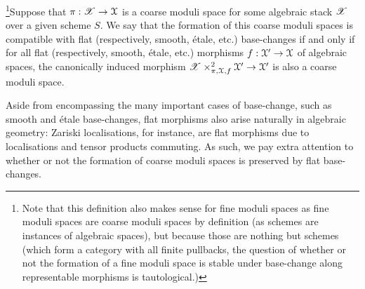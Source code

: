            \begin{definition} \label{def: stability_of_coarse_moduli_spaces}
                \footnote{Note that this definition also makes sense for fine moduli spaces as fine moduli spaces are coarse moduli spaces by definition (as schemes are instances of algebraic spaces), but because those are nothing but schemes (which form a category with all finite pullbacks, the question of whether or not the formation of a fine moduli space is stable under base-change along representable morphisms is tautological.)}Suppose that $\pi: \mathscr{X} \to \mathcal{X}$ is a coarse moduli space for some algebraic stack $\mathscr{X}$ over a given scheme $S$. We say that the formation of this coarse moduli spaces is compatible with flat (respectively, smooth, \'etale, etc.) base-changes if and only if for all flat (respectively, smooth, \'etale, etc.) morphisms $f: \mathcal{X}' \to \mathcal{X}$ of algebraic spaces, the canonically induced morphism $\scrX \x^2_{\pi, \calX, f} \calX' \to \calX'$ is also a coarse moduli space.   
            \end{definition}
            \begin{remark} \label{remark: flat_base_changes_of_coarse_moduli_spaces}
                Aside from encompassing the many important cases of base-change, such as smooth and \'etale base-changes, flat morphisms also arise naturally in algebraic geometry: Zariski localisations, for instance, are flat morphisms due to localisations and tensor products commuting. As such, we pay extra attention to whether or not the formation of coarse moduli spaces is preserved by flat base-changes. 
            \end{remark}
            
